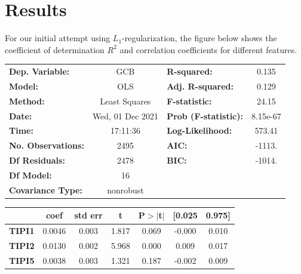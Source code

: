 \documentclass[11pt]{article}
\begin{document}
\section*{Results}
For our initial attempt using \(L_1\)-regularization, the figure below
shows the coefficient of determination \(R^2\) and correlation
coefficients for different features.
\begin{center}
\begin{tabular}{lclc}
\toprule
\textbf{Dep. Variable:}                &       GCB        & \textbf{  R-squared:         } &     0.135   \\
\textbf{Model:}                        &       OLS        & \textbf{  Adj. R-squared:    } &     0.129   \\
\textbf{Method:}                       &  Least Squares   & \textbf{  F-statistic:       } &     24.15   \\
\textbf{Date:}                         & Wed, 01 Dec 2021 & \textbf{  Prob (F-statistic):} &  8.15e-67   \\
\textbf{Time:}                         &     17:11:36     & \textbf{  Log-Likelihood:    } &    573.41   \\
\textbf{No. Observations:}             &        2495      & \textbf{  AIC:               } &    -1113.   \\
\textbf{Df Residuals:}                 &        2478      & \textbf{  BIC:               } &    -1014.   \\
\textbf{Df Model:}                     &          16      & \textbf{                     } &             \\
\textbf{Covariance Type:}              &    nonrobust     & \textbf{                     } &             \\
\bottomrule
\end{tabular}
\begin{tabular}{lcccccc}
                                       & \textbf{coef} & \textbf{std err} & \textbf{t} & \textbf{P$> |$t$|$} & \textbf{[0.025} & \textbf{0.975]}  \\
\midrule
\textbf{TIPI1}                         &       0.0046  &        0.003     &     1.817  &         0.069        &       -0.000    &        0.010     \\
\textbf{TIPI2}                         &       0.0130  &        0.002     &     5.968  &         0.000        &        0.009    &        0.017     \\
\textbf{TIPI5}                         &       0.0038  &        0.003     &     1.321  &         0.187        &       -0.002    &        0.009     \\

\end{tabular}
\end{center}
\end{document}
